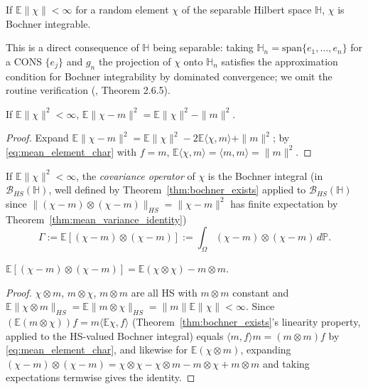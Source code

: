 \begin{theorem}
\label{thm:bochner_exists}
If $\mathbb{E}\|\chi\|<\infty$ for a random element $\chi$ of the
separable Hilbert space $\mathbb{H}$, $\chi$ is Bochner integrable.
\end{theorem}

This is a direct consequence of $\mathbb{H}$ being separable: taking
$\mathbb{H}_n=\mathrm{span}\{e_1,\dots,e_n\}$ for a CONS $\{e_j\}$ and
$g_n$ the projection of $\chi$ onto $\mathbb{H}_n$ satisfies the
approximation condition for Bochner integrability by dominated
convergence; we omit the routine verification (\cite{hsingeubank2015},
Theorem 2.6.5).

\begin{theorem}
\label{thm:mean_variance_identity}
If $\mathbb{E}\|\chi\|^2<\infty$, $\mathbb{E}\|\chi-m\|^2 = \mathbb{E}
\|\chi\|^2-\|m\|^2$.
\end{theorem}

\begin{proof}
Expand $\mathbb{E}\|\chi-m\|^2 = \mathbb{E}\|\chi\|^2 - 2\mathbb{E}\langle
\chi,m\rangle+\|m\|^2$; by \eqref{eq:mean_element_char} with $f=m$,
$\mathbb{E}\langle\chi,m\rangle=\langle m,m\rangle=\|m\|^2$.
\end{proof}

\begin{definition}
\label{def:covariance_operator}
If $\mathbb{E}\|\chi\|^2<\infty$, the \emph{covariance operator} of $\chi$
is the Bochner integral (in $\mathcal{B}_{HS}(\mathbb{H})$, well defined
by Theorem~\ref{thm:bochner_exists} applied to $\mathcal{B}_{HS}
(\mathbb{H})$ since $\|(\chi-m)\otimes(\chi-m)\|_{HS}=\|\chi-m\|^2$ has
finite expectation by Theorem~\ref{thm:mean_variance_identity})
\begin{equation}
\Gamma := \mathbb{E}[(\chi-m)\otimes(\chi-m)] := \int_\Omega(\chi-m)
\otimes(\chi-m)\,d\mathbb{P}.
\label{eq:covariance_operator_def}
\end{equation}
\end{definition}

\begin{theorem}
\label{thm:covariance_identity}
$\mathbb{E}[(\chi-m)\otimes(\chi-m)] = \mathbb{E}(\chi\otimes\chi)-m\otimes
m$.
\end{theorem}

\begin{proof}
$\chi\otimes m$, $m\otimes\chi$, $m\otimes m$ are all HS with $m\otimes m$
constant and $\mathbb{E}\|\chi\otimes m\|_{HS}=\mathbb{E}\|m\otimes\chi
\|_{HS}=\|m\|\mathbb{E}\|\chi\|<\infty$. Since $(\mathbb{E}(m\otimes\chi))f
= m\langle\mathbb{E}\chi,f\rangle$ (Theorem~\ref{thm:bochner_exists}'s
linearity property, applied to the HS-valued Bochner integral) equals
$\langle m,f\rangle m = (m\otimes m)f$ by \eqref{eq:mean_element_char},
and likewise for $\mathbb{E}(\chi\otimes m)$, expanding $(\chi-m)\otimes
(\chi-m) = \chi\otimes\chi-\chi\otimes m-m\otimes\chi+m\otimes m$ and
taking expectations termwise gives the identity.
\end{proof}


